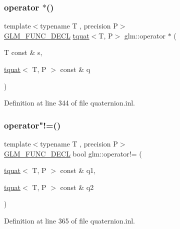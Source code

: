 \subsubsection{\texorpdfstring{operator $\ast$()}{operator *()}\hspace{0.1cm}{\footnotesize\ttfamily [7/7]}}
{\footnotesize\ttfamily template$<$typename T , precision P$>$ \\
\mbox{\hyperlink{setup_8hpp_ab2d052de21a70539923e9bcbf6e83a51}{G\+L\+M\+\_\+\+F\+U\+N\+C\+\_\+\+D\+E\+CL}} \mbox{\hyperlink{structglm_1_1tquat}{tquat}}$<$T, P$>$ glm\+::operator $\ast$ (\begin{DoxyParamCaption}\item[{T const \&}]{s,  }\item[{\mbox{\hyperlink{structglm_1_1tquat}{tquat}}$<$ T, P $>$ const \&}]{q }\end{DoxyParamCaption})}



Definition at line 344 of file quaternion.\+inl.

\mbox{\label{group__gtc__quaternion_gacbe1e859eb6558097bac5ec45955c60a}} 
\subsubsection{\texorpdfstring{operator"!=()}{operator!=()}}
{\footnotesize\ttfamily template$<$typename T , precision P$>$ \\
\mbox{\hyperlink{setup_8hpp_ab2d052de21a70539923e9bcbf6e83a51}{G\+L\+M\+\_\+\+F\+U\+N\+C\+\_\+\+D\+E\+CL}} bool glm\+::operator!= (\begin{DoxyParamCaption}\item[{\mbox{\hyperlink{structglm_1_1tquat}{tquat}}$<$ T, P $>$ const \&}]{q1,  }\item[{\mbox{\hyperlink{structglm_1_1tquat}{tquat}}$<$ T, P $>$ const \&}]{q2 }\end{DoxyParamCaption})}



Definition at line 365 of file quaternion.\+inl.

\mbox{\label{group__gtc__quaternion_ga6443d80d8429baec64193d0e31e580c8}} 
